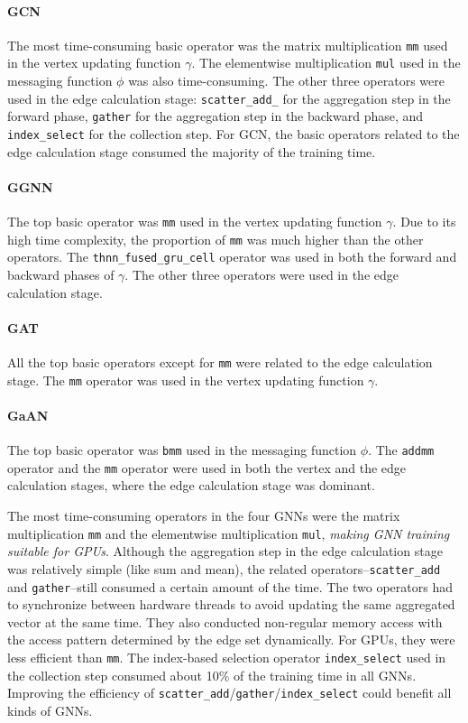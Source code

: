 \paragraph{GCN}
%
The most time-consuming basic operator was the matrix multiplication \texttt{mm} used in the vertex updating function $\gamma$.
%
The elementwise multiplication \texttt{mul} used in the messaging function $\phi$ was also time-consuming.
%
The other three operators were used in the edge calculation stage: \texttt{scatter\_add\_} for the aggregation step in the forward phase, \texttt{gather} for the aggregation step in the backward phase, and \texttt{index\_select} for the collection step.
%
For GCN, the basic operators related to the edge calculation stage consumed the majority of the training time.

\paragraph{GGNN}
%
The top basic operator was \texttt{mm} used in the vertex updating function $\gamma$.
%
Due to its high time complexity, the proportion of \texttt{mm} was much higher than the other operators.
%
The \texttt{thnn\_fused\_gru\_cell} operator was used in both the forward and backward phases of $\gamma$.
%
The other three operators were used in the edge calculation stage.

\paragraph{GAT}
%
All the top basic operators except for \texttt{mm} were related to the edge calculation stage.
%
The \texttt{mm} operator was used in the vertex updating function $\gamma$.

\paragraph{GaAN}
%
The top basic operator was \texttt{bmm} used in the messaging function $\phi$.
%
The \texttt{addmm} operator and the \texttt{mm} operator were used in both the vertex and the edge calculation stages, where the edge calculation stage was dominant.

The most time-consuming operators in the four GNNs were the matrix multiplication \texttt{mm} and the elementwise multiplication \texttt{mul}, \emph{making GNN training suitable for GPUs}.
%
Although the aggregation step in the edge calculation stage was relatively simple (like sum and mean), the related operators--\texttt{scatter\_add} and \texttt{gather}--still consumed a certain amount of the time.
%
The two operators had to synchronize between hardware threads to avoid updating the same aggregated vector at the same time.
%
They also conducted non-regular memory access with the access pattern determined by the edge set dynamically.
%
For GPUs, they were less efficient than \texttt{mm}.
%
The index-based selection operator \texttt{index\_select} used in the collection step consumed about 10\% of the training time in all GNNs.
%
Improving the efficiency of \texttt{scatter\_add}/\texttt{gather}/\texttt{index\_select} could benefit all kinds of GNNs.


